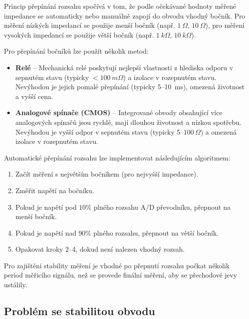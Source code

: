 Princip přepínání rozsahu spočívá v tom, že podle očekávané hodnoty měřené impedance se automaticky nebo manuálně zapojí do obvodu vhodný bočník.
Pro měření nízkých impedancí se použije menší bočník (např. $1\ \Omega$, $10\ \Omega$), 
pro měření vysokých impedancí se použije větší bočník (např. $1\ \unit{k\Omega}$, $10\ \unit{k\Omega}$).

Pro přepínání bočníků lze použít několik metod:
\begin{itemize}
    \item \textbf{Relé} -- Mechanická relé poskytují nejlepší vlastnosti z hlediska odporu v sepnutém stavu (typicky $< 100\ \unit{m\Omega}$) a izolace v rozepnutém stavu.
    Nevýhodou je jejich pomalé přepínání (typicky 5--10~ms), omezená životnost a vyšší cena. \cite{citrelay_j104d}
    \item \textbf{Analogové spínače (\acs{CMOS})} -- Integrované obvody obsahující více analogových spínačů jsou rychlé, mají dlouhou životnost a nízkou spotřebu.
    Nevýhodou je vyšší odpor v sepnutém stavu (typicky 5--$100\ \Omega$) a omezená izolace v rozepnutém stavu.
\end{itemize}


Automatické přepínání rozsahu lze implementovat následujícím algoritmem:
\begin{tcolorbox}[colback=gray!10, colframe=black!50, boxrule=0.7pt, arc=2pt]
\begin{enumerate}
    \item Začít měření s největším bočníkem (pro nejvyšší impedance).
    \item Změřit napětí na bočníku.
    \item Pokud je napětí pod $10\%$ plného rozsahu \acs{A/D} převodníku, přepnout na menší bočník.
    \item Pokud je napětí nad $90\%$ plného rozsahu, přepnout na větší bočník.
    \item Opakovat kroky 2--4, dokud není nalezen vhodný rozsah.
\end{enumerate}
\end{tcolorbox}

Pro zajištění stability měření je vhodné po přepnutí rozsahu počkat několik period měřicího signálu, než se provede finální měření, aby se přechodové jevy ustálily.


\subsection{Problém se stabilitou obvodu}
\label{sec:stability}

